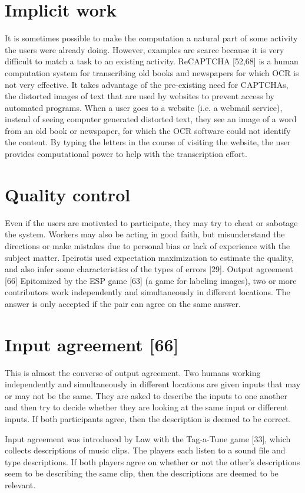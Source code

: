 \documentclass{acm_proc_article-sp}
\begin{document}
\section*{Implicit work}
It is sometimes possible to make the computation a natural part of some activity the users were already doing. However, examples are scarce because it is very difficult to match a task to an existing activity.
ReCAPTCHA [52,68] is a human computation system for transcribing old books and newspapers for which OCR is not very effective. It takes advantage of the pre-existing need for CAPTCHAs, the distorted images of text that are used by websites to prevent access by automated programs. When a user goes to a website (i.e. a webmail service), instead of seeing computer generated distorted text, they see an image of a word from an old book or newspaper, for which the OCR software could not identify the content. By typing the letters in the course of visiting the website, the user provides computational power to help with the transcription effort.
\section*{Quality control}
Even if the users are motivated to participate, they may try to cheat or sabotage the system. Workers may also be acting in good faith, but misunderstand the directions or make mistakes due to personal bias or lack of experience with the subject matter. Ipeirotis used expectation maximization to estimate the quality, and also infer some characteristics of the types of errors [29].
Output agreement [66]
Epitomized by the ESP game [63] (a game for labeling images), two or more contributors work independently and simultaneously in different locations. The answer is only accepted if the pair can agree on the same answer.
\section*{Input agreement [66]}
This is almost the converse of output agreement. Two humans working independently and simultaneously in different locations are given inputs that may or may not be the same. They are asked to describe the inputs to one another and then try to decide whether they are looking at the same input or different inputs. If both participants agree, then the description is deemed to be correct.

Input agreement was introduced by Law with the Tag-a-Tune game [33], which collects descriptions of music clips. The players each listen to a sound file and type descriptions. If both players agree on whether or not the other’s descriptions seem to be describing the same clip, then the descriptions are deemed to be relevant.
\end{document}
